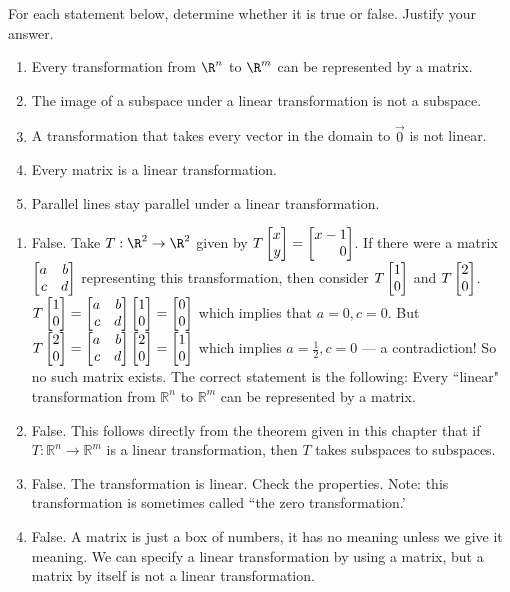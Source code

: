 \begin{exercises}
\begin{problist}
		\prob For each statement below, determine whether it is true or false. Justify your answer.
		\begin{enumerate}
			\item Every transformation from $\R^n$ to $\R^m$ can be represented by a matrix.
			\item The image of a subspace under a linear transformation is not a subspace.
			\item A transformation that takes every vector in the domain to $\vec 0$ is not linear.
			\item Every matrix is a linear transformation.
			\item Parallel lines stay parallel under a linear transformation.
		\end{enumerate}
		\begin{solution}
			\begin{enumerate}
				\item False. Take $T : \R^2 \rightarrow \R^2$ given by $T\mat{x\\y} = \mat{x-1\\0}$. If there were a matrix $\mat{a & b \\ c& d}$ representing this transformation, then consider $T\mat{1\\0}$ and $T\mat{2\\0}$.
$T\mat{1\\0}=\mat{a & b \\ c& d}\mat{1\\0}=\mat{0\\0}$ which implies that $a=0, c=0$.
But $T\mat{2\\0}=\mat{a & b \\ c& d} \mat{2\\0}= \mat{1\\0}$ which implies $a=\tfrac{1}{2},c=0$ --- a contradiction!
So no such matrix exists.  The correct statement is the following: Every ``linear" transformation from $\mathbb{R}^n$ to $\mathbb{R}^m$ can be represented by a matrix.
				\item False. This follows directly from the theorem given in this chapter that if
 $T : \mathbb R^n \rightarrow \mathbb R^m$ is a linear transformation, then $T$ takes subspaces to subspaces.
 				\item False. The transformation is linear. Check the properties. Note: this transformation is sometimes called ``the zero transformation.'
				\item False. A matrix is just a box of numbers, it has no meaning unless we give it meaning. We can specify a linear transformation by using a matrix, but a matrix by itself is not a linear transformation.

\end{enumerate}
\end{solution}
\end{problist}
\end{exercises}
